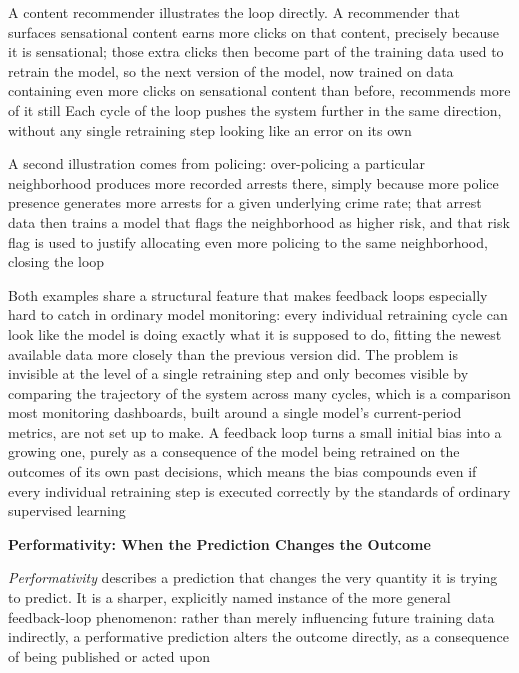 A content recommender illustrates the loop directly. A recommender that surfaces
sensational content earns more clicks on that content, precisely because it is sensational;
those extra clicks then become part of the training data used to retrain the
model, so the next version of the model, now trained on data containing even
more clicks on sensational content than before, recommends more of it still
Each cycle of the loop pushes the system further in the same direction, without any
single retraining step looking like an error on its own

A second illustration comes from policing: over-policing a particular neighborhood
produces more recorded arrests there, simply because more police presence
generates more arrests for a given underlying crime rate; that arrest data then trains
a model that flags the neighborhood as higher risk, and that risk flag is used
to justify allocating even more policing to the same neighborhood, closing the loop

Both examples share a structural feature that makes feedback loops especially
hard to catch in ordinary model monitoring: every individual retraining cycle can
look like the model is doing exactly what it is supposed to do, fitting the
newest available data more closely than the previous version did. The problem is
invisible at the level of a single retraining step and only becomes visible by comparing
the trajectory of the system across many cycles, which is a comparison most
monitoring dashboards, built around a single model's current-period metrics, are
not set up to make. A feedback loop turns a small initial bias into a growing one,
purely as a consequence of the model being retrained on the outcomes of its own
past decisions, which means the bias compounds even if every individual retraining
step is executed correctly by the standards of ordinary supervised learning

\textbf{Performativity: When the Prediction Changes the Outcome}

\begin{definition}
  \emph{Performativity} describes a prediction that changes the very quantity it
  is trying to predict. It is a sharper, explicitly named instance of the more
  general feedback-loop phenomenon: rather than merely influencing future training
  data indirectly, a performative prediction alters the outcome directly, as a consequence
  of being published or acted upon
\end{definition}

